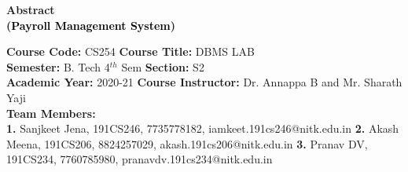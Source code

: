 \documentclass[12pt]{article}
\begin{document}


\begin{center}
    \textbf{\Large{Abstract \\
    (\textcolor{black}{Payroll Management System})}}
\end{center}

\noindent 
\textbf{Course Code:} CS254
\hspace{1.97in} 
\textbf{Course Title:} DBMS LAB \\
\textbf{Semester:} B. Tech 4$^{th}$ Sem 
\hspace{1.59in} 
\textbf{Section:} S2 \\
\textbf{Academic Year:} 2020-21 
\hspace{1.75in} 
\textbf{Course Instructor:} Dr. Annappa B and Mr. Sharath Yaji \\
\textbf{Team Members:} \\
\textbf{1.} Sanjkeet Jena, 191CS246, 7735778182, iamkeet.191cs246@nitk.edu.in 
\newline
\textbf{2.} Akash Meena, 191CS206, 8824257029, akash.191cs206@nitk.edu.in
\newline
\textbf{3.} Pranav DV, 191CS234, 7760785980, pranavdv.191cs234@nitk.edu.in

\vspace{0.25in}
\end{document}

